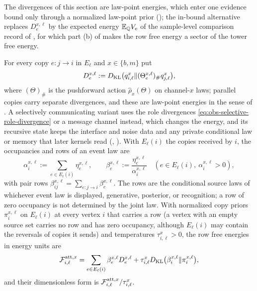 The divergences of this section are law-point energies, which enter one evidence bound only
through a normalized law-point prior (); the in-bound alternative
replaces $D^{x,\ell}_e$ by the expected energy $\mathbb E_{\mathbb Q}V_e$ of the sample-level comparison
record of , for which part (b) of
 makes the row free energy a sector of the tower free energy.

For every copy $e:j\to i$ in $E_\ell$ and $x\in\{b,m\}$ put
\begin{equation}
D^{x,\ell}_e:=D_{\mathrm{KL}}\bigl(q^x_{i,\ell}\Vert(\Theta^{x,\ell}_e)_\#q^x_{j,\ell}\bigr),
\label{eq:full-graph-transported-divergences}
\end{equation}
where $(\Theta)_\#$ is the pushforward action $\widehat\rho_x(\Theta)$ on channel-$x$
laws; parallel copies carry separate divergences, and these are law-point energies in
the sense of . A selectively communicating variant uses the
role divergences \eqref{eq:obs-selective-role-divergence} or a message channel
instead, which changes the energy, and its recursive state keeps the interface and
noise data and any private conditional law or memory that later kernels read
(, ). With $E_\ell(i)$
the copies received by $i$, the occupancies and rows of an event law are
\begin{equation}
\alpha^{x,\ell}_i:=\sum_{e\in E_\ell(i)}\eta^{x,\ell}_e,
\qquad
\beta^{x,\ell}_e:=\frac{\eta^{x,\ell}_e}{\alpha^{x,\ell}_i}
\quad(e\in E_\ell(i),\ \alpha^{x,\ell}_i>0),
\label{eq:full-graph-edge-event-disintegration}
\end{equation}
with pair rows $\beta^{x,\ell}_{ij}=\sum_{e:j\to i}\beta^{x,\ell}_e$. The rows are the
conditional source laws of whichever event law is displayed, generative, posterior,
or recognition; a row of zero occupancy is not determined by the joint law. With
normalized copy priors $\pi^{x,\ell}_i$ on $E_\ell(i)$ at every vertex $i$ that carries a row (a
vertex with an empty source set carries no row and has zero occupancy, although $E_\ell(i)$ may
contain the reversals of copies it sends) and temperatures
$\tau^x_{i,\ell}>0$, the row free energies in energy units are
\begin{equation}
\mathcal F^{\mathrm{att},x}_{i,\ell}
=\sum_{e\in E_\ell(i)}\beta^{x,\ell}_eD^{x,\ell}_e
+\tau^x_{i,\ell}D_{\mathrm{KL}}\bigl(\beta^{x,\ell}_i\Vert\pi^{x,\ell}_i\bigr),
\label{eq:full-graph-row-free-energies}
\end{equation}
and their dimensionless form is $\mathcal F^{\mathrm{att},x}_{i,\ell}/\tau^x_{i,\ell}$.

